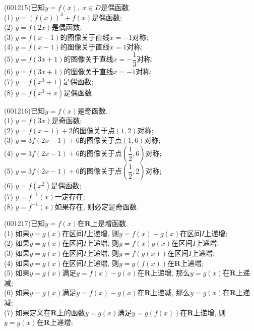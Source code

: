 \item (001215)已知$y=f(x), \ x \in D$是偶函数.\\ 
(1) $y=(f(x))^3+f(x)$是偶函数;\\ 
(2) $y=f(2x)$是偶函数;\\ 
(3) $y=f(x-1)$的图像关于直线$x=-1$对称;\\ 
(4) $y=f(x-1)$的图像关于直线$x=1$对称;\\ 
(5) $y=f(3x+1)$的图像关于直线$x=-\dfrac{1}{3}$对称;\\ 
(6) $y=f(3x+1)$的图像关于直线$x=-1$对称;\\ 
(7) $y=f(x^3+1)$是偶函数;\\ 
(8) $y=f(x^3+x)$是偶函数.
\item (001216)已知$y=f(x)$是奇函数.\\ 
(1) $y=f(3x)$是奇函数;\\ 
(2) $y=f(x-1)+2$的图像关于点$(1,2)$对称;\\ 
(3) $y=3f(2x-1)+6$的图像关于点$(1,6)$对称;\\ 
(4) $y=3f(2x-1)+6$的图像关于点$(\dfrac{1}{2},6)$对称;\\ 
(5) $y=3f(2x-1)+6$的图像关于点$(\dfrac{1}{2},2)$对称;\\ 
(6) $y=f(x^2)$是偶函数;\\ 
(7) $y=f^{-1}(x)$一定存在;\\ 
(8) $y=f^{-1}(x)$如果存在, 则必定是奇函数.
\item (001217)已知$y=f(x)$在$\mathbf{R}$上是增函数.\\ 
(1) 如果$y=g(x)$在区间$I$上递增, 则$y=f(x)+g(x)$在区间$I$上递增;\\ 
(2) 如果$y=g(x)$在区间$I$上递增, 则$y=f(x)g(x)$在区间$I$上递增;\\ 
(3) 如果$y=g(x)$在区间$I$上递增, 则$y=f(g(x))$在区间$I$上递增;\\ 
(4) 如果$y=g(x)$在区间$I$上递增, 则$y=g(f(x))$在$\mathbf{R}$上递增;\\ 
(5) 如果$y=g(x)$满足$y=f(x)-g(x)$在$\mathbf{R}$上递增, 那么$y=g(x)$在$\mathbf{R}$上递减;\\ 
(6) 如果$y=g(x)$满足$y=f(x)-g(x)$在$\mathbf{R}$上递减, 那么$y=g(x)$在$\mathbf{R}$上递减;\\ 
(7) 如果定义在$\mathbf{R}$上的函数$y=g(x)$满足$y=g(f(x))$在$\mathbf{R}$上递增, 则$y=g(x)$在$\mathbf{R}$上递增;\\ 
